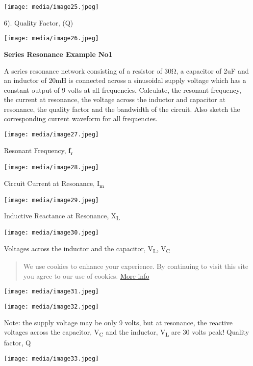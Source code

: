 \documentclass[]{article}
\begin{document}
\texttt{[image: media/image25.jpeg]}

6). Quality Factor, (Q)

\texttt{[image: media/image26.jpeg]}

\textbf{Series Resonance Example No1}

A series resonance network consisting of a resistor of 30Ω, a capacitor
of 2uF and an inductor of 20mH is connected across a sinusoidal supply
voltage which has a constant output of 9 volts at all frequencies.
Calculate, the resonant frequency, the current at resonance, the voltage
across the inductor and capacitor at resonance, the quality factor and
the bandwidth of the circuit. Also sketch the corresponding current
waveform for all frequencies.

\texttt{[image: media/image27.jpeg]}

Resonant Frequency, \textbf{ƒ}\textsubscript{r}

\texttt{[image: media/image28.jpeg]}

Circuit Current at Resonance, I\textsubscript{m}

\texttt{[image: media/image29.jpeg]}

Inductive Reactance at Resonance, X\textsubscript{L}

\texttt{[image: media/image30.jpeg]}

Voltages across the inductor and the capacitor, V\textsubscript{L},
V\textsubscript{C}

\begin{quote}
We use cookies to enhance your experience. By continuing to visit this
site you agree to our use of cookies.
\href{http://wikipedia.org/wiki/HTTP_cookie}{More info}
\end{quote}

\texttt{[image: media/image31.jpeg]}

\texttt{[image: media/image32.jpeg]}

Note: the supply voltage may be only 9 volts, but at resonance, the
reactive voltages across the capacitor, V\textsubscript{C} and the
inductor, V\textsubscript{L} are 30 volts peak! Quality factor, Q

\texttt{[image: media/image33.jpeg]}
\end{document}
